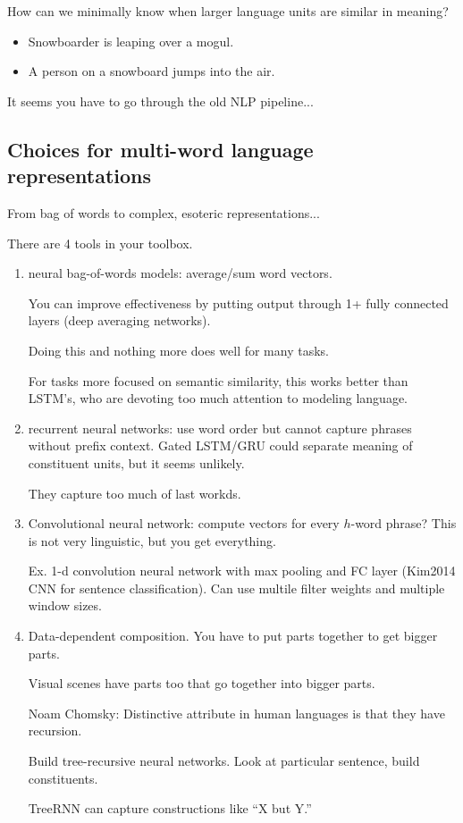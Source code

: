How can we minimally know when larger language units are similar in meaning?

\begin{itemize}
\item
Snowboarder is leaping over a mogul.
\item
A person on a snowboard jumps into the air.
\end{itemize}
It seems you have to go through the old NLP pipeline...

\subsection{Choices for multi-word language representations}


From bag of words to complex, esoteric representations...

There are 4 tools in your toolbox.
\begin{enumerate}
\item
neural bag-of-words models: average/sum word vectors.

You can improve effectiveness by putting output through 1+ fully connected layers (deep averaging networks).

Doing this and nothing more does well for many tasks.

For tasks more focused on semantic similarity, this works better than LSTM's, who are devoting too much attention to modeling language. 
\item
recurrent neural networks: use word order but cannot capture phrases without prefix context. Gated LSTM/GRU could separate meaning of constituent units, but it seems unlikely.

They capture too much of last workds.
\item
Convolutional neural network: compute vectors for every $h$-word phrase? This is not very linguistic, but you get everything.

Ex. 1-d convolution neural network with max pooling and FC layer (Kim2014 CNN for sentence classification). Can use multile filter weights and multiple window sizes.
\item
Data-dependent composition.
You have to put parts together  to get bigger parts.

Visual scenes have parts too that go together into bigger parts.

Noam Chomsky:
Distinctive attribute in human languages is that they have recursion.

Build tree-recursive neural networks. Look at particular sentence, build constituents.

TreeRNN can capture constructions like ``X but Y.''
\end{enumerate}

